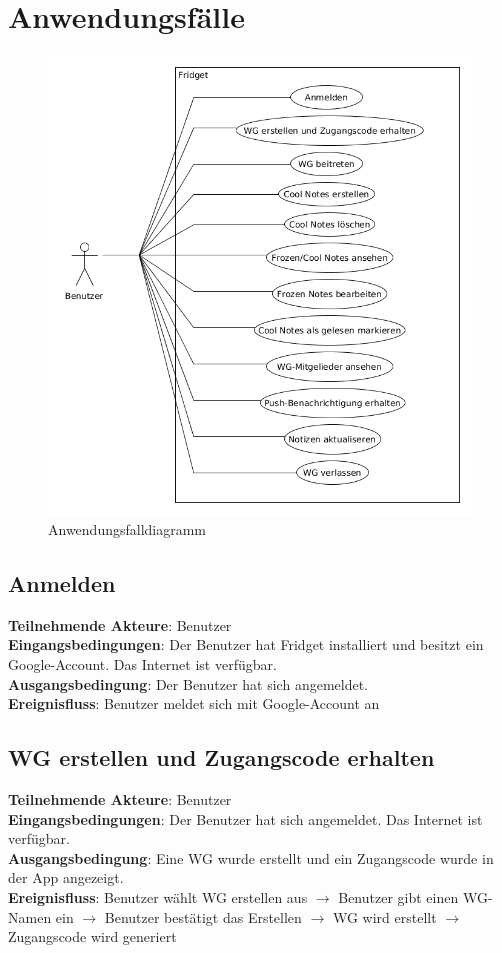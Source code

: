 \documentclass[a4paper]{scrreprt}
\begin{document}
        \section{Anwendungsfälle}
        	\begin{figure}[H]
        		\centering
        		\includegraphics[scale = .6]{anwendungsfalldiagramm.png}
        		\caption{Anwendungsfalldiagramm}
        	\end{figure}
        	
        	\subsection{Anmelden}
        \textbf{Teilnehmende Akteure}: Benutzer \\
		\textbf{Eingangsbedingungen}: Der Benutzer hat Fridget installiert und besitzt ein Google-Account. Das Internet ist verfügbar. \\
		\textbf{Ausgangsbedingung}: Der Benutzer hat sich angemeldet. \\
		\textbf{Ereignisfluss}: Benutzer meldet sich mit Google-Account an
		
		\subsection{WG erstellen und Zugangscode erhalten}
		\textbf{Teilnehmende Akteure}: Benutzer \\
		\textbf{Eingangsbedingungen}: Der Benutzer hat sich angemeldet. Das Internet ist verfügbar. \\
		\textbf{Ausgangsbedingung}: Eine WG wurde erstellt und ein Zugangscode wurde in der App angezeigt. \\
		\textbf{Ereignisfluss}: Benutzer wählt WG erstellen aus $\rightarrow$ Benutzer gibt einen WG-Namen ein $\rightarrow$ Benutzer bestätigt das Erstellen $\rightarrow$ WG wird erstellt $\rightarrow$ Zugangscode wird generiert
		
\end{document}
